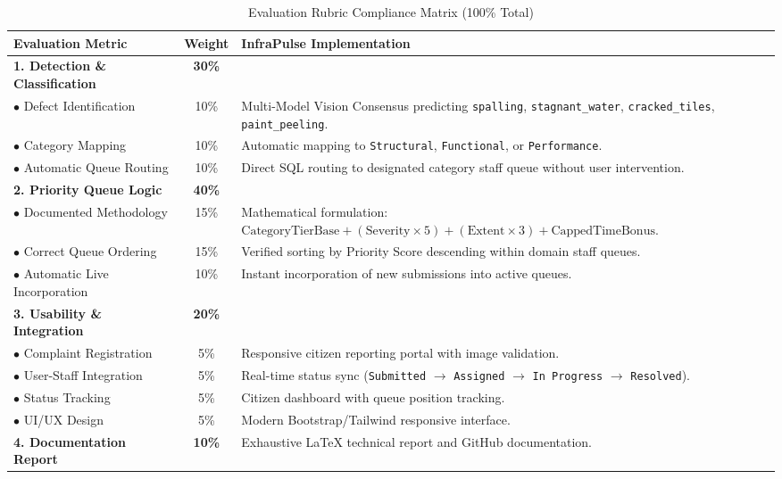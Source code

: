 \documentclass[11pt,a4paper]{article}
\begin{document}
\begin{table}[H]
\centering
\caption{Evaluation Rubric Compliance Matrix (100\% Total)}
\label{tab:rubric}
\begin{tabular}{p{4.5cm}cp{7cm}}
\toprule
\textbf{Evaluation Metric} & \textbf{Weight} & \textbf{InfraPulse Implementation} \\
\midrule
\textbf{1. Detection \& Classification} & \textbf{30\%} & \\
$\bullet$ Defect Identification & 10\% & Multi-Model Vision Consensus predicting \texttt{spalling}, \texttt{stagnant\_water}, \texttt{cracked\_tiles}, \texttt{paint\_peeling}. \\
$\bullet$ Category Mapping & 10\% & Automatic mapping to \texttt{Structural}, \texttt{Functional}, or \texttt{Performance}. \\
$\bullet$ Automatic Queue Routing & 10\% & Direct SQL routing to designated category staff queue without user intervention. \\
\midrule
\textbf{2. Priority Queue Logic} & \textbf{40\%} & \\
$\bullet$ Documented Methodology & 15\% & Mathematical formulation: $\text{CategoryTierBase} + (\text{Severity} \times 5) + (\text{Extent} \times 3) + \text{CappedTimeBonus}$. \\
$\bullet$ Correct Queue Ordering & 15\% & Verified sorting by Priority Score descending within domain staff queues. \\
$\bullet$ Automatic Live Incorporation & 10\% & Instant incorporation of new submissions into active queues. \\
\midrule
\textbf{3. Usability \& Integration} & \textbf{20\%} & \\
$\bullet$ Complaint Registration & 5\% & Responsive citizen reporting portal with image validation. \\
$\bullet$ User-Staff Integration & 5\% & Real-time status sync (\texttt{Submitted} $\rightarrow$ \texttt{Assigned} $\rightarrow$ \texttt{In Progress} $\rightarrow$ \texttt{Resolved}). \\
$\bullet$ Status Tracking & 5\% & Citizen dashboard with queue position tracking. \\
$\bullet$ UI/UX Design & 5\% & Modern Bootstrap/Tailwind responsive interface. \\
\midrule
\textbf{4. Documentation Report} & \textbf{10\%} & Exhaustive LaTeX technical report and GitHub documentation. \\
\bottomrule
\end{tabular}
\end{table}
\end{document}
